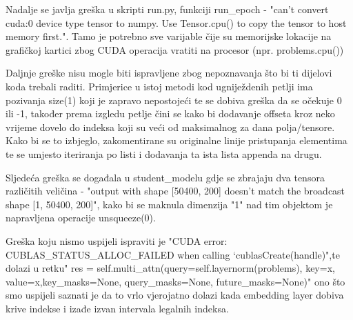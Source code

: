 		Nadalje se javlja greška u skripti run.py, funkciji run\_epoch - "can't convert cuda:0 device type tensor to numpy. Use Tensor.cpu() to copy the tensor to host memory first.". Tamo je potrebno sve varijable čije su memorijske lokacije na grafičkoj kartici zbog CUDA operacija vratiti na procesor (npr. problems.cpu())
		
		Daljnje greške nisu mogle biti ispravljene zbog nepoznavanja što bi ti dijelovi koda trebali raditi. Primjerice u istoj metodi kod ugniježdenih petlji ima pozivanja size(1) koji je zapravo nepostojeći te se dobiva greška da se očekuje 0 ili -1, također prema izgledu petlje čini se kako bi dodavanje offseta kroz neko vrijeme dovelo do indeksa koji su veći od maksimalnog za dana polja/tensore. Kako bi se to izbjeglo, zakomentirane su originalne linije pristupanja elementima te se umjesto iteriranja po listi i dodavanja ta ista lista appenda na drugu.
		
		Sljedeća greška se događala u student\_modelu gdje se zbrajaju dva tensora različitih veličina - "output with shape [50400, 200] doesn't match the broadcast shape [1, 50400, 200]", kako bi se maknula dimenzija "1" nad tim objektom je napravljena operacije unsqueeze(0).
		
		Greška koju nismo uspijeli ispraviti je "CUDA error: CUBLAS\_STATUS\_ALLOC\_FAILED when calling `cublasCreate(handle)",te dolazi u
		retku" res = self.multi\_attn(query=self.layernorm(problems), key=x, value=x,key\_masks=None, query\_masks=None, future\_masks=None)" ono što smo uspijeli saznati je da to vrlo vjerojatno dolazi kada embedding layer dobiva krive indekse i izađe izvan intervala legalnih indeksa.
		
